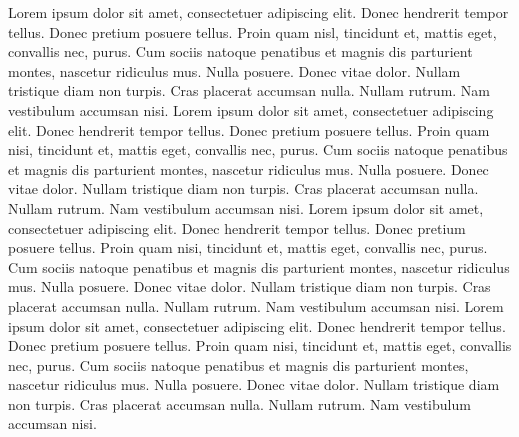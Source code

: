 \documentclass[12pt]{report}
\begin{document}
Lorem ipsum dolor sit amet, consectetuer adipiscing elit. Donec
hendrerit tempor tellus. Donec pretium posuere tellus. Proin quam
nisl, tincidunt et, mattis eget, convallis nec, purus. Cum sociis
natoque penatibus et magnis dis parturient montes, nascetur ridiculus
mus. Nulla posuere. Donec vitae dolor. Nullam tristique diam non
turpis. Cras placerat accumsan nulla. Nullam rutrum. Nam vestibulum
accumsan nisi.  Lorem ipsum dolor sit amet, consectetuer adipiscing
elit. Donec hendrerit tempor tellus. Donec pretium posuere
tellus. Proin quam nisi, tincidunt et, mattis eget, convallis nec,
purus. Cum sociis natoque penatibus et magnis dis parturient montes,
nascetur ridiculus mus. Nulla posuere. Donec vitae dolor. Nullam
tristique diam non turpis. Cras placerat accumsan nulla. Nullam
rutrum. Nam vestibulum accumsan nisi.  Lorem ipsum dolor sit amet,
consectetuer adipiscing elit. Donec hendrerit tempor tellus. Donec
pretium posuere tellus. Proin quam nisi, tincidunt et, mattis eget,
convallis nec, purus. Cum sociis natoque penatibus et magnis dis
parturient montes, nascetur ridiculus mus. Nulla posuere. Donec vitae
dolor. Nullam tristique diam non turpis. Cras placerat accumsan
nulla. Nullam rutrum. Nam vestibulum accumsan nisi.  Lorem ipsum dolor
sit amet, consectetuer adipiscing elit. Donec hendrerit tempor
tellus. Donec pretium posuere tellus. Proin quam nisi, tincidunt et,
mattis eget, convallis nec, purus. Cum sociis natoque penatibus et
magnis dis parturient montes, nascetur ridiculus mus. Nulla
posuere. Donec vitae dolor. Nullam tristique diam non turpis. Cras
placerat accumsan nulla. Nullam rutrum. Nam vestibulum accumsan nisi.
\end{document}
